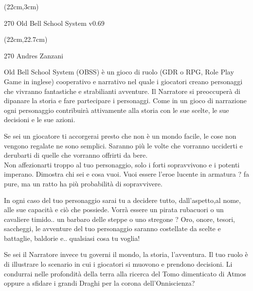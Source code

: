 \documentclass[10pt,a4paper]{article}
\def \versione {0.69}
\begin{document}
\begin{textblock*}{2cm}(22cm,3cm) %
\begin{turn}{270}
	{\Huge Old Bell School System v\versione}\\
\end{turn}
\end{textblock*}


\begin{textblock*}{2cm}(22cm,22.7cm) %
\begin{turn}{270}
	{\Huge Andres Zanzani}
\end{turn}
\end{textblock*}



Old Bell School System (OBSS) è un gioco di ruolo (GDR o RPG, Role Play Game in inglese) cooperativo e narrativo nel quale i giocatori creano personaggi che vivranno fantastiche e strabilianti avventure. Il Narratore si preoccuperà di dipanare la storia e fare partecipare i personaggi. Come in un gioco di narrazione ogni personaggio contribuirà attivamente alla storia con le sue scelte, le sue decisioni e le sue azioni.

Se sei un giocatore ti accorgerai presto che non è un mondo facile, le cose non vengono regalate ne sono semplici. Saranno più le volte che vorranno ucciderti e derubarti di quelle che vorranno offrirti da bere.\\
Non affezionarti troppo al tuo personaggio, solo i forti sopravvivono e i potenti imperano. Dimostra chi sei e cosa vuoi. Vuoi essere l'eroe lucente in armatura ? fa pure, ma un ratto ha più probabilità di sopravvivere.

In ogni caso del tuo personaggio sarai tu a decidere tutto, dall'aspetto,al nome, alle sue capacità e ciò che possiede. Vorrà essere un pirata rubacuori o un cavaliere timido.. un barbaro delle steppe o uno stregone ? Oro, onore, tesori, saccheggi, le avventure del tuo personaggio saranno costellate da scelte e battaglie, baldorie e.. qualsiasi cosa tu voglia!

Se sei il Narratore invece tu governi il mondo,  la storia, l'avventura. Il tuo ruolo è di illustrare lo scenario in cui i giocatori si muovono e prendono decisioni. Li condurrai nelle profondità della terra alla ricerca del Tomo dimenticato di Atmos oppure a sfidare i grandi Draghi per la corona dell'Onniscienza?
\end{document}
